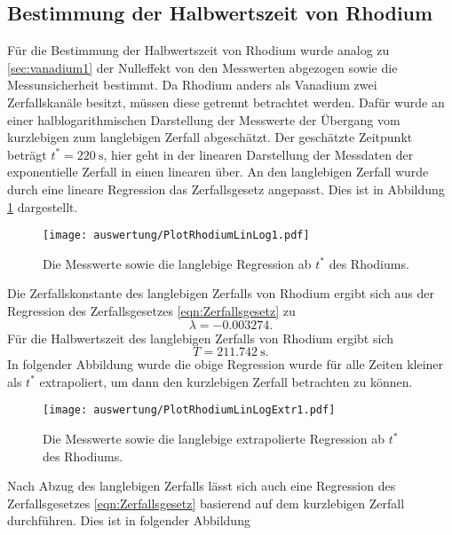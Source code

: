 \subsection{Bestimmung der Halbwertszeit von Rhodium}
  Für die Bestimmung der Halbwertszeit von Rhodium wurde analog zu \ref{sec:vanadium1} der Nulleffekt von den Messwerten abgezogen sowie die Messunsicherheit bestimmt. Da Rhodium anders als Vanadium
  zwei Zerfallskanäle besitzt, müssen diese getrennt betrachtet werden. Dafür wurde an einer halblogarithmischen Darstellung der Messwerte der Übergang vom kurzlebigen zum langlebigen Zerfall
  abgeschätzt. Der geschätzte Zeitpunkt beträgt $t^{*} = \SI{220}{\second}$, hier geht in der linearen Darstellung der Messdaten der exponentielle Zerfall in einen linearen über. An den langlebigen
  Zerfall wurde durch eine lineare Regression das Zerfallsgesetz angepasst. Dies ist in Abbildung \ref{fig:PlotRhodiumLinLog1} dargestellt.
  \begin{figure}[H]
    \centering
    \caption{Die Messwerte sowie die langlebige Regression ab $t^{*}$ des Rhodiums.}
    \label{fig:PlotRhodiumLinLog1}
    \texttt{[image: auswertung/PlotRhodiumLinLog1.pdf]}
  \end{figure}
  \noindent
  Die Zerfallskonstante des langlebigen Zerfalls von Rhodium ergibt sich aus der Regression des Zerfallsgesetzes \ref{eqn:Zerfallsgesetz} zu
  \begin{equation}
    \label{eqn:zerfallskonstanterhodiumergebnisslanglebig}
    \lambda = -0.003274.
  \end{equation}
  Für die Halbwertszeit des langlebigen Zerfalls von Rhodium ergibt sich
  \begin{equation}
    \label{eqn:halbwertszeitrhodiumergebnisslanglebig}
    T = \SI{211.742}{\second}.
  \end{equation}
  In folgender Abbildung wurde die obige Regression wurde für alle Zeiten kleiner als $t^{*}$ extrapoliert, um dann den kurzlebigen Zerfall betrachten zu können.
  \begin{figure}[H]
    \centering
    \caption{Die Messwerte sowie die langlebige extrapolierte Regression ab $t^{*}$ des Rhodiums.}
    \label{fig:PlotRhodiumLinLogExtr1}
    \texttt{[image: auswertung/PlotRhodiumLinLogExtr1.pdf]}
  \end{figure}
  \noindent
  Nach Abzug des langlebigen Zerfalls lässt sich auch eine Regression des Zerfallsgesetzes \ref{eqn:Zerfallsgesetz} basierend auf dem kurzlebigen Zerfall durchführen. Dies ist in folgender Abbildung
